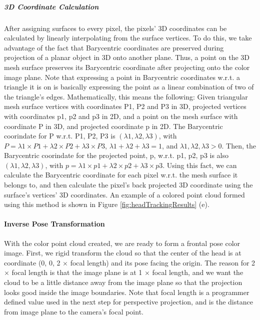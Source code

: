 \documentclass{ut-thesis}
\begin{document}
\subparagraph{3D Coordinate Calculation}
After assigning surfaces to every pixel, the pixels' 3D coordinates can be calculated by linearly interpolating from the surface vertices.  To do this, we take advantage of the fact that Barycentric coordinates are preserved during projection of a planar object in 3D onto another plane.  Thus, a point on the 3D mesh surface preserves its Barycentric coordinate after projecting onto the color image plane.  Note that expressing a point in Barycentric coordinates w.r.t. a triangle it is on is basically expressing the point as a linear combination of two of the triangle's edges.  Mathematically, this means the following: Given triangular mesh surface vertices with coordinates P1, P2 and P3 in 3D, projected vertices with coordinates p1, p2 and p3 in 2D, and a point on the mesh surface with coordinate P in 3D, and projected coordinate p in 2D.  The Barycentric coorindate for P w.r.t. {P1, P2, P3} is \( (\lambda1, \lambda2, \lambda3)  \), with \( P = \lambda1 \times P1 + \lambda2 \times P2 + \lambda3 \times P3 \), \( \lambda1 + \lambda2 + \lambda3 = 1 \), and \( \lambda1, \lambda2, \lambda3 > 0 \).  Then, the Barycentric coorindate for the projected point, p, w.r.t. {p1, p2, p3} is also \( (\lambda1, \lambda2, \lambda3)  \), with \( p = \lambda1 \times p1 + \lambda2 \times p2 + \lambda3 \times p3 \).  Using this fact, we can calculate the Barycentric coordinate for each pixel w.r.t. the mesh surface it belongs to, and then calculate the pixel's back projected 3D coordinate using the surface's vertices' 3D coordinates.  An example of a colored point cloud formed using this method is shown in Figure \ref{fig:headTrackingResults} (e).

\paragraph{Inverse Pose Transformation}
With the color point cloud created, we are ready to form a frontal pose color image.  First, we rigid transform the cloud so that the center of the head is at coordinate (0, 0, 2 \( \times\) focal length) and its pose facing the origin.  The reason for 2 \( \times\) focal length is that the image plane is at 1 \( \times\) focal length, and we want the cloud to be a little distance away from the image plane so that the projection looks good inside the image boundaries.  Note that focal length is a programmer defined value used in the next step for perspective projection, and is the distance from image plane to the camera's focal point.
\end{document}
